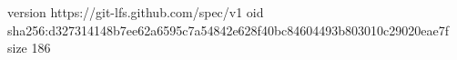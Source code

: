 version https://git-lfs.github.com/spec/v1
oid sha256:d327314148b7ee62a6595c7a54842e628f40bc84604493b803010c29020eae7f
size 186
